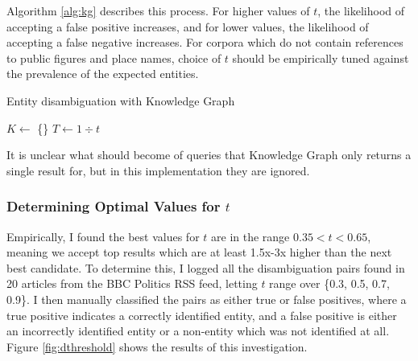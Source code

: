 Algorithm \ref{alg:kg} describes this process. For higher values of $t$, the likelihood of accepting a false positive increases, and for lower values, the likelihood of accepting a false negative increases. For corpora which do not contain references to public figures and place names, choice of $t$ should be empirically tuned against the prevalence of the expected entities.

\begin{algorithm}
\label{alg:kg}
 \caption{Entity disambiguation with Knowledge Graph}
 $K \gets$ \{\}\;
 $T \gets 1\div{t}$\;
\end{algorithm}

It is unclear what should become of queries that Knowledge Graph only returns a single result for, but in this implementation they are ignored.

\subsubsection{Determining Optimal Values for $t$}

Empirically, I found the best values for $t$ are in the range $0.35 < t < 0.65$, meaning we accept top results which are at least 1.5x-3x higher than the next best candidate. To determine this, I logged all the disambiguation pairs found in 20 articles from the BBC Politics RSS feed, letting $t$ range over \{0.3, 0.5, 0.7, 0.9\}. I then manually classified the pairs as either true or false positives, where a true positive indicates a correctly identified entity, and a false positive is either an incorrectly identified entity or a non-entity which was not identified at all. Figure \ref{fig:dthreshold} shows the results of this investigation.

